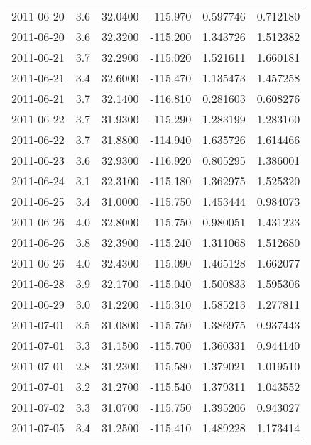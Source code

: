 \begin{tabular}{lrrrrr}
2011-06-20 &       3.6 &  32.0400 &  -115.970 &         0.597746 &         0.712180 \\
2011-06-20 &       3.6 &  32.3200 &  -115.200 &         1.343726 &         1.512382 \\
2011-06-21 &       3.7 &  32.2900 &  -115.020 &         1.521611 &         1.660181 \\
2011-06-21 &       3.4 &  32.6000 &  -115.470 &         1.135473 &         1.457258 \\
2011-06-21 &       3.7 &  32.1400 &  -116.810 &         0.281603 &         0.608276 \\
2011-06-22 &       3.7 &  31.9300 &  -115.290 &         1.283199 &         1.283160 \\
2011-06-22 &       3.7 &  31.8800 &  -114.940 &         1.635726 &         1.614466 \\
2011-06-23 &       3.6 &  32.9300 &  -116.920 &         0.805295 &         1.386001 \\
2011-06-24 &       3.1 &  32.3100 &  -115.180 &         1.362975 &         1.525320 \\
2011-06-25 &       3.4 &  31.0000 &  -115.750 &         1.453444 &         0.984073 \\
2011-06-26 &       4.0 &  32.8000 &  -115.750 &         0.980051 &         1.431223 \\
2011-06-26 &       3.8 &  32.3900 &  -115.240 &         1.311068 &         1.512680 \\
2011-06-26 &       4.0 &  32.4300 &  -115.090 &         1.465128 &         1.662077 \\
2011-06-28 &       3.9 &  32.1700 &  -115.040 &         1.500833 &         1.595306 \\
2011-06-29 &       3.0 &  31.2200 &  -115.310 &         1.585213 &         1.277811 \\
2011-07-01 &       3.5 &  31.0800 &  -115.750 &         1.386975 &         0.937443 \\
2011-07-01 &       3.3 &  31.1500 &  -115.700 &         1.360331 &         0.944140 \\
2011-07-01 &       2.8 &  31.2300 &  -115.580 &         1.379021 &         1.019510 \\
2011-07-01 &       3.2 &  31.2700 &  -115.540 &         1.379311 &         1.043552 \\
2011-07-02 &       3.3 &  31.0700 &  -115.750 &         1.395206 &         0.943027 \\
2011-07-05 &       3.4 &  31.2500 &  -115.410 &         1.489228 &         1.173414 \\

\end{tabular}
